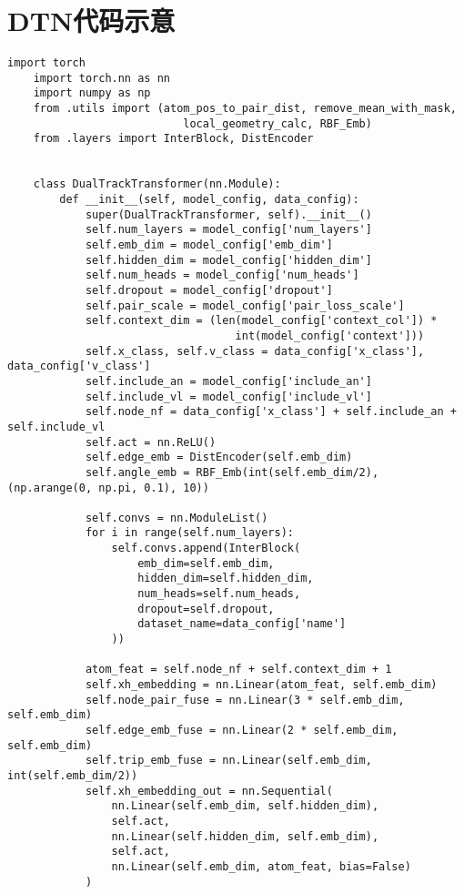 {\section{DTN代码示意}
\begin{lstlisting}[style=python]
    import torch
    import torch.nn as nn
    import numpy as np
    from .utils import (atom_pos_to_pair_dist, remove_mean_with_mask, 
                           local_geometry_calc, RBF_Emb)
    from .layers import InterBlock, DistEncoder
    
    
    class DualTrackTransformer(nn.Module):
        def __init__(self, model_config, data_config):
            super(DualTrackTransformer, self).__init__()
            self.num_layers = model_config['num_layers']
            self.emb_dim = model_config['emb_dim']
            self.hidden_dim = model_config['hidden_dim']
            self.num_heads = model_config['num_heads']
            self.dropout = model_config['dropout']
            self.pair_scale = model_config['pair_loss_scale']
            self.context_dim = (len(model_config['context_col']) * 
                                   int(model_config['context']))
            self.x_class, self.v_class = data_config['x_class'], data_config['v_class']
            self.include_an = model_config['include_an']
            self.include_vl = model_config['include_vl']
            self.node_nf = data_config['x_class'] + self.include_an + self.include_vl
            self.act = nn.ReLU()
            self.edge_emb = DistEncoder(self.emb_dim)
            self.angle_emb = RBF_Emb(int(self.emb_dim/2), (np.arange(0, np.pi, 0.1), 10))
    
            self.convs = nn.ModuleList()
            for i in range(self.num_layers):
                self.convs.append(InterBlock(
                    emb_dim=self.emb_dim,
                    hidden_dim=self.hidden_dim,
                    num_heads=self.num_heads,
                    dropout=self.dropout,
                    dataset_name=data_config['name']
                ))
    
            atom_feat = self.node_nf + self.context_dim + 1
            self.xh_embedding = nn.Linear(atom_feat, self.emb_dim)
            self.node_pair_fuse = nn.Linear(3 * self.emb_dim, self.emb_dim)
            self.edge_emb_fuse = nn.Linear(2 * self.emb_dim, self.emb_dim)
            self.trip_emb_fuse = nn.Linear(self.emb_dim, int(self.emb_dim/2))
            self.xh_embedding_out = nn.Sequential(
                nn.Linear(self.emb_dim, self.hidden_dim),
                self.act,
                nn.Linear(self.hidden_dim, self.emb_dim),
                self.act,
                nn.Linear(self.emb_dim, atom_feat, bias=False)
            )
    

\end{lstlisting}}
